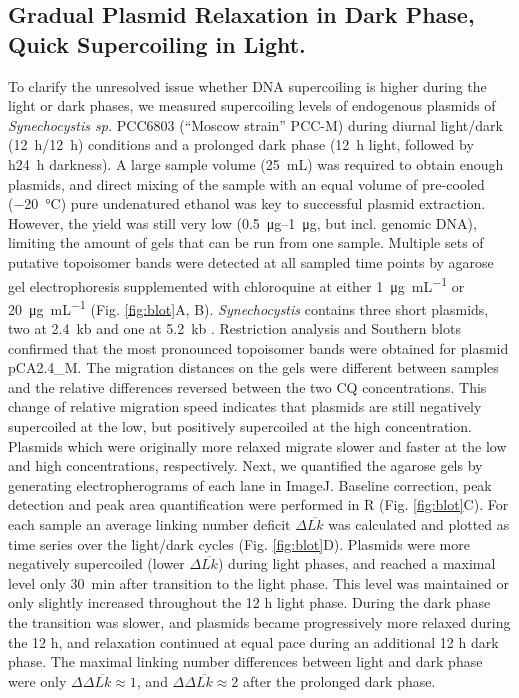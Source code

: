 \documentclass[10pt,a4]{article}
\def\cite#1{\hypersetup{citecolor=Teal}\citep{#1}} %
\newcommand{\ugml}{\micro\gram\per\milli\liter}
\newcommand{\mL}{\milli\liter}
\newcommand{\scyst}{\textit{Synechocystis}}
\newcommand{\remove}[1]{\begingroup\color{gray}\endgroup}
\begin{document}
\subsection{Gradual Plasmid Relaxation in Dark Phase, Quick Supercoiling in
  Light.}

To clarify the unresolved issue whether DNA supercoiling is higher
during the light or dark phases, we measured supercoiling levels of
endogenous plasmids of \textit{Synechocystis sp.} PCC6803 (``Moscow
strain'' PCC-M) \remove{and \textit{Synechococcus elongatus} PCC 7942}
during diurnal light/dark (\SI{12}{\hour}/\SI{12}{\hour}) conditions
and a prolonged dark phase (\SI{12}{\hour} light, followed by
h\SI{24}{\hour} darkness).  A large sample volume (\SI{25}{\mL}) was
required to obtain enough plasmids, and direct mixing of the sample
with an equal volume of pre-cooled (\SI{-20}{\celsius}) pure
undenatured ethanol was key to successful plasmid extraction. However,
the yield was still very low (\SIrange{0.5}{1}{\ug}, but incl. genomic
DNA), limiting the amount of gels that can be run from one sample.
%
Multiple sets of putative topoisomer bands were detected at all
sampled time points by agarose gel electrophoresis supplemented with
chloroquine at either \SI{1}{\ugml} or \SI{20}{\ugml}
(Fig. \ref{fig:blot}A, B). \scyst{} contains three short plasmids, two
at \SI{2.4}{kb} \cite{Yang1993b, Yang1994} and one at \SI{5.2}{kb}
\cite{Xu1997b}. Restriction analysis and Southern blots confirmed that
the most pronounced topoisomer bands were obtained for plasmid
pCA2.4\_M.
%
The migration distances on the gels were different between samples and
the relative differences reversed between the two CQ
concentrations. This change of relative migration speed indicates that
plasmids are still negatively supercoiled at the low, but positively
supercoiled at the high concentration. Plasmids which were originally
more relaxed migrate slower and faster at the low and high
concentrations, respectively.  \remove{Topo I relaxation time series
  of pooled samples from light and dark phases further confirmed that
  more relaxed plasmids migrate faster at the high CQ concentration
  (Fig. \ref{fig:topoi}A).}
%
Next, we quantified the agarose gels by generating electropherograms
of each lane in ImageJ. Baseline correction, peak detection and peak
area quantification were performed in R (Fig. \ref{fig:blot}C). For
each sample an average linking number deficit $\Delta \overline{Lk}$
was calculated and plotted as time series over the light/dark cycles
(Fig. \ref{fig:blot}D).  Plasmids were more negatively supercoiled
(lower $\Delta \overline{Lk}$) during light phases, and reached a
maximal level only \SI{30}{\minute} after transition to the light
phase. This level was maintained or only slightly increased throughout
the 12 h light phase.  During the dark phase the transition was
slower, and plasmids became progressively more relaxed during the 12
h, and relaxation continued at equal pace during an additional 12 h
dark phase.
%
The maximal linking number differences between light and dark phase
were only $\Delta \Delta \overline{Lk} \approx 1$, and $\Delta \Delta
\overline{Lk} \approx 2$ after the prolonged dark phase.
\end{document}
